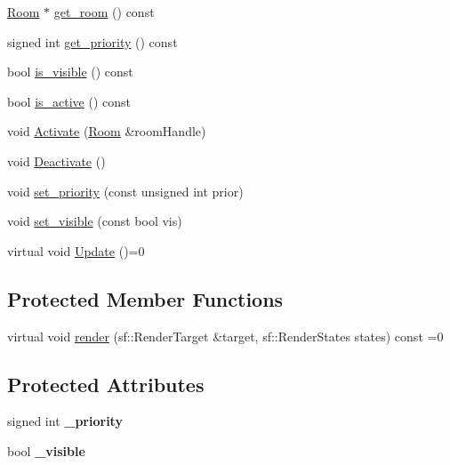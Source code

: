 \begin{DoxyCompactItemize}
\item 
\hyperlink{class_helios_1_1_room}{Room} $\ast$ \hyperlink{class_helios_1_1_base_obj_a896030076cb96c794f4b202cca0ec584}{get\+\_\+room} () const 
\item 
signed int \hyperlink{class_helios_1_1_base_obj_abf2a6d187e1c8329bb8e24256218aecb}{get\+\_\+priority} () const 
\item 
bool \hyperlink{class_helios_1_1_base_obj_a418fb8f5e8aa25f0969e37e24cadb8c9}{is\+\_\+visible} () const 
\item 
bool \hyperlink{class_helios_1_1_base_obj_a8c748b30dca39c303e8bb9085f9d6d15}{is\+\_\+active} () const 
\item 
void \hyperlink{class_helios_1_1_base_obj_a7823cb052c6c97f4aab120f6eb864392}{Activate} (\hyperlink{class_helios_1_1_room}{Room} \&room\+Handle)
\item 
void \hyperlink{class_helios_1_1_base_obj_ade0a810a861f41a43adf0e7c766951d1}{Deactivate} ()
\item 
void \hyperlink{class_helios_1_1_base_obj_ad3335cdcb1dfc4ee7e749dbb32f8cd2a}{set\+\_\+priority} (const unsigned int prior)
\item 
void \hyperlink{class_helios_1_1_base_obj_a354767a20905778fefe96fe895a382ae}{set\+\_\+visible} (const bool vis)
\item 
virtual void \hyperlink{class_helios_1_1_base_obj_aa42e26e872234b6871d159c29afdef17}{Update} ()=0
\end{DoxyCompactItemize}
\subsection*{Protected Member Functions}
\begin{DoxyCompactItemize}
\item 
virtual void \hyperlink{class_helios_1_1_base_obj_af7355477f06d38692dc6cdb6f99dbd11}{render} (sf\+::\+Render\+Target \&target, sf\+::\+Render\+States states) const  =0
\end{DoxyCompactItemize}
\subsection*{Protected Attributes}
\begin{DoxyCompactItemize}
\item 
\hypertarget{class_helios_1_1_base_obj_aad807d0a4296ffdfddf2e653b428481a}{}signed int {\bfseries \+\_\+priority}\label{class_helios_1_1_base_obj_aad807d0a4296ffdfddf2e653b428481a}

\item 
\hypertarget{class_helios_1_1_base_obj_aed78a9a68c038e6d82e07711f9065e33}{}bool {\bfseries \+\_\+visible}\label{class_helios_1_1_base_obj_aed78a9a68c038e6d82e07711f9065e33}

\end{DoxyCompactItemize}


